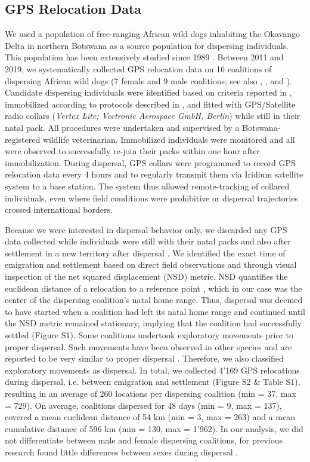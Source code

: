 \documentclass[abstract=on,10pt,a4paper,bibliography=totocnumbered]{article}
\begin{document}
\subsection{GPS Relocation Data}
We used a population of free-ranging African wild dogs inhabiting the Okavango
Delta in northern Botswana as a source population for dispersing individuals.
This population has been extensively studied since 1989 \citep{McNutt.1996,
McNutt.2008, Cozzi.2013, Cozzi.2020, Behr.2020}. Between 2011 and 2019, we
systematically collected GPS relocation data on 16 coalitions of dispersing
African wild dogs (7 female and 9 male coalitions; see also \cite{Abrahms.2017},
\cite{Cozzi.2020}, and \cite{Behr.2020}). Candidate dispersing individuals were
identified based on criteria reported in \cite{Behr.2020}, immobilized according
to protocols described in \cite{Osofsky.1996}, and fitted with GPS/Satellite
radio collars (\textit{Vertex Lite; Vectronic Aerospace GmbH, Berlin}) while
still in their natal pack. All procedures were undertaken and supervised by a
Botswana-registered wildlife veterinarian. Immobilized individuals were
monitored and all were observed to successfully re-join their packs within one
hour after immobilization. During dispersal, GPS collars were programmed to
record GPS relocation data every 4 hours and to regularly transmit them via
Iridium satellite system to a base station. The system thus allowed
remote-tracking of collared individuals, even where field conditions were
prohibitive or dispersal trajectories crossed international borders.

Because we were interested in dispersal behavior only, we discarded any GPS data
collected while individuals were still with their natal packs and also after
settlement in a new territory after dispersal \citep{Cozzi.2020}. We identified
the exact time of emigration and settlement based on direct field observations
and through visual inspection of the net squared displacement (NSD) metric. NSD
quantifies the euclidean distance of a relocation to a reference point
\citep{Borger.2012}, which in our case was the center of the dispersing
coalition's natal home range. Thus, dispersal was deemed to have started when a
coalition had left its natal home range and continued until the NSD metric
remained stationary, implying that the coalition had successfully settled
(Figure S1). Some coalitions undertook exploratory movements prior to proper
dispersal. Such movements have been observed in other species and are reported
to be very similar to proper dispersal \citep{Killeen.2014}. Therefore, we also
classified exploratory movements as dispersal. In total, we collected 4'169 GPS
relocations during dispersal, i.e. between emigration and settlement (Figure S2
\& Table S1), resulting in an average of 260 locations per dispersing coalition
(min = 37, max = 729). On average, coalitions dispersed for 48 days (min = 9,
max = 137), covered a mean euclidean distance of 54 km (min = 3, max = 263) and
a mean cumulative distance of 596 km (min = 130, max = 1'962). In our analysis,
we did not differentiate between male and female dispersing coalitions, for
previous research found little differences between sexes during dispersal
\citep{Woodroffe.2019, Cozzi.2020}.
\end{document}
